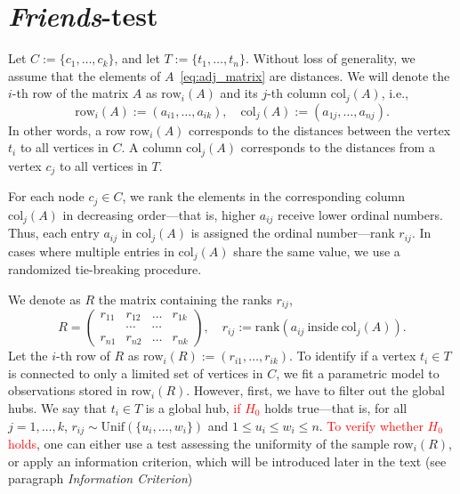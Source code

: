 \documentclass{llncs}
\begin{document}
\section{\textit{Friends}-test}
\label{sec:method}
Let $C := \{c_1, \dots, c_k\}$, and let $T := \{t_1, \dots, t_n\}$. 
Without loss of generality, we assume that the elements of $A$~\eqref{eq:adj_matrix} are distances.  
 We will denote the $i$-th row of the matrix $A$ as $\text{row}_i(A)$ and its $j$-th column $\text{col}_j(A)$, i.e.,
\[
\text{row}_i(A) := (a_{i1}, \dots, a_{ik}),
\quad
\text{col}_j(A) := (a_{1j}, \dots, a_{nj}).
\]
In other words, a row $\text{row}_i(A)$ corresponds to the distances between the vertex $t_i$ to all vertices in $C$. A column $\text{col}_j(A)$ corresponds to the distances from a vertex $c_j$ to all vertices in $T$. 




For each node $c_j \in C$, we rank the elements in the corresponding column $\text{col}_j(A)$ in decreasing order---that is, higher $a_{ij}$ receive lower ordinal numbers. Thus, each entry $a_{ij} $ in $\text{col}_j(A)$ is assigned the ordinal number---rank $r_{ij}$. In cases where multiple entries in $\text{col}_j(A)$ share the same value, we use a randomized tie-breaking procedure.

We denote as $R$ the matrix containing the ranks $r_{ij}$, 
\begin{equation*}
R = \begin{pmatrix}
r_{11} & r_{12} & \dots & r_{1k} \\
 &\cdots & \cdots & \\
r_{n1} & r_{n2} & \dots & r_{nk}
\end{pmatrix}, 
\quad
r_{ij} :=\text{rank}\left(a_{ij}~ \text{inside}~\text{col}_j(A)\right).
\end{equation*}
Let the $i$-th row of $R$ as $\text{row}_i(R) := (r_{i1}, \dots, r_{ik})$. To identify if a vertex $t_i\in T$ is connected to only a limited set of vertices in $C$, we fit a parametric model to observations stored in $\text{row}_i(R)$. However, first, we have to filter out the global hubs. We say that $t_i\in T$ is a global hub, \textcolor{red}{if $H_0$} holds true---that is, for all $j = 1, \dots, k$,
$r_{ij} \sim \text{Unif}(\{u_i, \dots, w_i\})$ and $1\le u_i \le w_i \le n$. \textcolor{red}{To verify whether $H_0$ holds}, one can either use a test assessing the uniformity of the sample $\text{row}_i(R)$, or apply an information criterion, which will be introduced later in the text (see paragraph \textit{Information Criterion}) 
\end{document}
